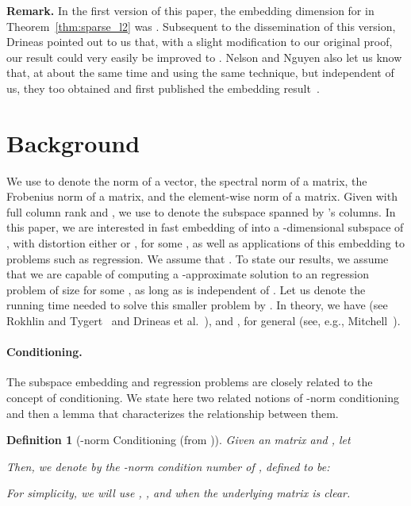 \documentclass[11pt]{article}
\newtheorem{definition}{Definition}
\begin{document}
\textbf{Remark.}
In the first version of this paper, the embedding dimension for  in
Theorem~\ref{thm:sparse_l2} was .
Subsequent to the dissemination of this version, Drineas pointed out to us that,
with a slight modification to our original proof, our result could very easily
be improved to .
Nelson and Nguyen also let us know that, at about the same time and using the
same technique, but independent of us, they too obtained and first published the
 embedding result~\cite{nelson2012osnap}.

\section{Background}
\label{sxn:lbackground} 

We use  to denote the  norm of a vector,  the
spectral norm of a matrix,  the Frobenius norm of a matrix, and
 the element-wise  norm of a matrix.
Given  with full column rank and , we 
use  to denote the  subspace spanned by 's columns.
In this paper, we are interested in fast embedding of  into a
-dimensional subspace of , with distortion
either  or , for some , as well as
applications of this embedding to problems such as  regression.
We assume that .
To state our results, we assume that we are capable of computing a
-approximate solution to an  regression problem of size
 for some , as long as  is independent of .
Let us denote the running time needed to solve this smaller problem by
.
In theory, we have 
(see Rokhlin and Tygert~\cite{RT08} and Drineas et 
al.~\cite{DMMS07_FastL2_NM10}), and , for general  (see, e.g.,
Mitchell~\cite{mitchell2003polynomial}).



\paragraph{Conditioning.}
The  subspace embedding and  regression problems are closely
related to the concept of conditioning.  
We state here two related notions of -norm conditioning and then a lemma
that characterizes the relationship between them.

\begin{definition}[-norm Conditioning (from \cite{CDMMMW13_SODA})]
  \label{def:lpnormcond}
  Given an  matrix  and , let
  
  Then, we denote by  the \emph{-norm condition number of
    }, defined to be:
  
  For simplicity, we will use , , and 
   when the underlying matrix is clear.
\end{definition}
\end{document}
